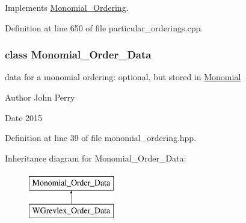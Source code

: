 Implements \hyperlink{group__orderinggroup_ab6c02638f87382f7a9a95b994e9a5dfb}{Monomial\+\_\+\+Ordering}.



Definition at line 650 of file particular\+\_\+orderings.\+cpp.

\label{class_monomial___order___data}
\subsubsection{class Monomial\+\_\+\+Order\+\_\+\+Data}
data for a monomial ordering\+: optional, but stored in {\ttfamily \hyperlink{group__polygroup_class_monomial}{Monomial}} 

\begin{DoxyAuthor}{Author}
John Perry 
\end{DoxyAuthor}
\begin{DoxyDate}{Date}
2015 
\end{DoxyDate}


Definition at line 39 of file monomial\+\_\+ordering.\+hpp.

Inheritance diagram for Monomial\+\_\+\+Order\+\_\+\+Data\+:\begin{figure}[H]
\begin{center}
\leavevmode
\includegraphics[height=2.000000cm]{group__orderinggroup}
\end{center}
\end{figure}
